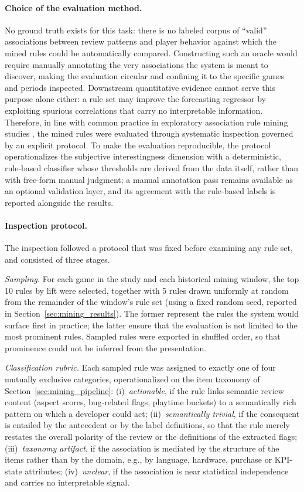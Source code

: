 \paragraph{Choice of the evaluation method.} No ground truth exists for this task: there is no labeled corpus of ``valid'' associations between review patterns and player behavior against which the mined rules could be automatically compared. Constructing such an oracle would require manually annotating the very associations the system is meant to discover, making the evaluation circular and confining it to the specific games and periods inspected. Downstream quantitative evidence cannot serve this purpose alone either: a rule set may improve the forecasting regressor by exploiting spurious correlations that carry no interpretable information. Therefore, in line with common practice in exploratory association rule mining studies \cite{fernandez2022survey_arm_text}, the mined rules were evaluated through systematic inspection governed by an explicit protocol. To make the evaluation reproducible, the protocol operationalizes the subjective interestingness dimension with a deterministic, rule-based classifier whose thresholds are derived from the data itself, rather than with free-form manual judgment; a manual annotation pass remains available as an optional validation layer, and its agreement with the rule-based labels is reported alongside the results.

\paragraph{Inspection protocol.} The inspection followed a protocol that was fixed before examining any rule set, and consisted of three stages.

\emph{Sampling.} For each game in the study and each historical mining window, the top 10 rules by lift were selected, together with 5 rules drawn uniformly at random from the remainder of the window's rule set (using a fixed random seed, reported in Section~\ref{sec:mining_results}). The former represent the rules the system would surface first in practice; the latter ensure that the evaluation is not limited to the most prominent rules. Sampled rules were exported in shuffled order, so that prominence could not be inferred from the presentation.

\emph{Classification rubric.} Each sampled rule was assigned to exactly one of four mutually exclusive categories, operationalized on the item taxonomy of Section~\ref{sec:mining_pipeline}: (i)~\emph{actionable}, if the rule links semantic review content (aspect scores, bug-related flags, playtime buckets) to a semantically rich pattern on which a developer could act; (ii)~\emph{semantically trivial}, if the consequent is entailed by the antecedent or by the label definitions, so that the rule merely restates the overall polarity of the review or the definitions of the extracted flags; (iii)~\emph{taxonomy artifact}, if the association is mediated by the structure of the items rather than by the domain, e.g., by language, hardware, purchase or KPI-state attributes; (iv)~\emph{unclear}, if the association is near statistical independence and carries no interpretable signal.


